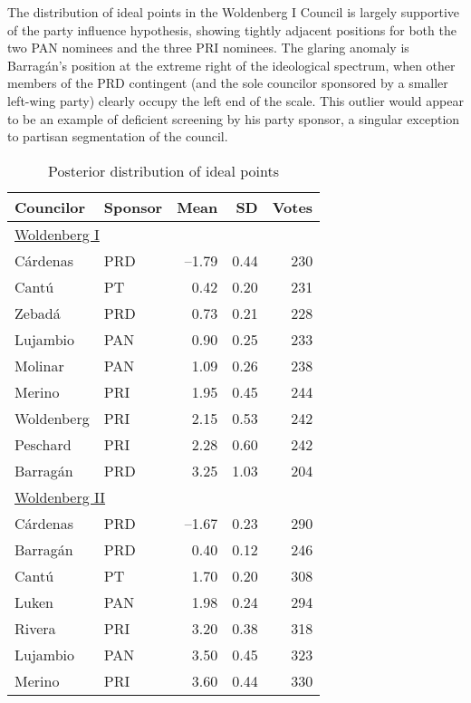 \documentclass[12 pt, letter]{article}
\begin{document}
The distribution of ideal points in the Woldenberg I Council is
largely supportive of the party influence hypothesis, showing
tightly adjacent positions for both the two PAN nominees and the
three PRI nominees.  The glaring anomaly is Barrag\'an's position at
the extreme right of the ideological spectrum, when other members of
the PRD contingent (and the sole councilor sponsored by a smaller
left-wing party) clearly occupy the left end of the scale.  This
outlier would appear to be an example of deficient screening by his
party sponsor, a singular exception to partisan segmentation of the
council.

\begin{table}
\caption{Posterior distribution of ideal points}\label{T:idealpoints}
\begin{center}
\begin{tabular}{llrrr}
\hline
 Councilor   &  Sponsor  &    Mean    & SD & Votes\\ \hline
\multicolumn{5}{l}{\underline{Woldenberg I}}   \\ [1.5ex]
C\'ardenas        & PRD &--1.79  &   0.44 & 230\\
Cant\'u           & PT  &  0.42  &   0.20 & 231\\
Zebad\'a          & PRD &  0.73  &   0.21 & 228\\
Lujambio          & PAN &  0.90  &   0.25 & 233\\
Molinar           & PAN &  1.09  &   0.26 & 238\\
Merino            & PRI &  1.95  &   0.45 & 244\\
Woldenberg        & PRI &  2.15  &   0.53 & 242\\
Peschard          & PRI &  2.28  &   0.60 & 242\\
Barrag\'an        & PRD &  3.25  &   1.03 & 204\\ [1ex]
\multicolumn{5}{l}{\underline{Woldenberg II}}  \\ [1.5ex]
C\'ardenas        & PRD &--1.67  &   0.23 & 290\\
Barrag\'an        & PRD &  0.40  &   0.12 & 246\\
Cant\'u           & PT  &  1.70  &   0.20 & 308\\
Luken             & PAN &  1.98  &   0.24 & 294\\
Rivera            & PRI &  3.20  &   0.38 & 318\\
Lujambio          & PAN &  3.50  &   0.45 & 323\\
Merino            & PRI &  3.60  &   0.44 & 330\\

\end{tabular}
\end{center}
\end{table}
\end{document}
